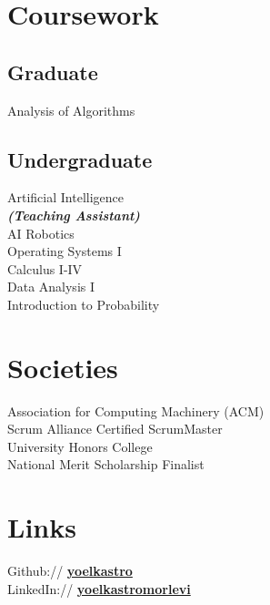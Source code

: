 \documentclass{deedy-resume-reversed}
\begin{document}
\begin{minipage}[t]{0.33\textwidth}

\section{Coursework}
\subsection{Graduate}
Analysis of Algorithms
\sectionsep

\subsection{Undergraduate}
Artificial Intelligence \\
{\footnotesize \textit{\textbf{(Teaching Assistant) }}} \\
AI Robotics \\
Operating Systems I \\
Calculus I-IV \\
Data Analysis I \\
Introduction to Probability \\
\sectionsep


\section{Societies}
Association for Computing Machinery (ACM)\\
Scrum Alliance Certified ScrumMaster\\
University Honors College\\
National Merit Scholarship Finalist \\
\sectionsep


\section{Links}
Github:// \href{https://github.com/}{\bf yoelkastro} \\
LinkedIn://  \href{https://www.linkedin.com/}{\bf yoelkastromorlevi}
\sectionsep

\end{minipage}
\end{document}
